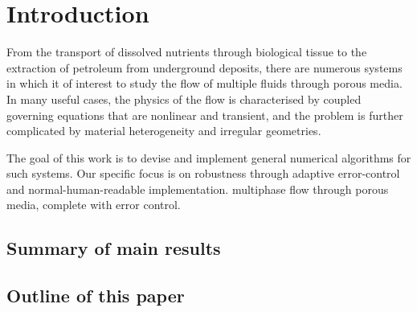 \section{Introduction}
\label{introduction}

From the transport of dissolved nutrients through biological tissue to
the extraction of petroleum from underground deposits, there are
numerous systems in which it of interest to study the flow of multiple
fluids through porous media. In many useful cases, the physics of the
flow is characterised by coupled governing equations that are
nonlinear and transient, and the problem is further complicated by
material heterogeneity and irregular geometries.

The goal of this work is to devise and implement general numerical
algorithms for such systems. Our specific focus is on robustness
through adaptive error-control and normal-human-readable
implementation. multiphase flow through porous media, complete with
error control.

\subsection{Summary of main results}
\label{results-summary}

\subsection{Outline of this paper}
\label{outline}

